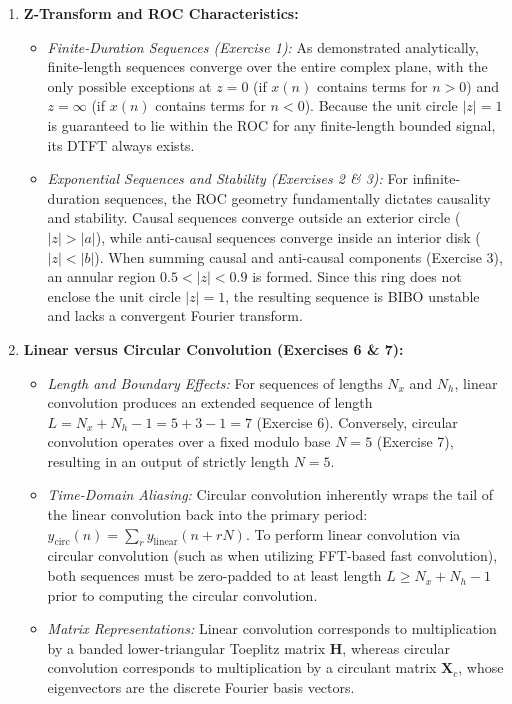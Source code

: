 \documentclass[12pt,a4paper]{article}
\begin{document}
\begin{enumerate}
    \item \textbf{Z-Transform and ROC Characteristics:}
    \begin{itemize}
        \item \emph{Finite-Duration Sequences (Exercise 1):} As demonstrated analytically, finite-length sequences converge over the entire complex plane, with the only possible exceptions at $z = 0$ (if $x(n)$ contains terms for $n > 0$) and $z = \infty$ (if $x(n)$ contains terms for $n < 0$). Because the unit circle $|z| = 1$ is guaranteed to lie within the ROC for any finite-length bounded signal, its DTFT always exists.
        \item \emph{Exponential Sequences and Stability (Exercises 2 \& 3):} For infinite-duration sequences, the ROC geometry fundamentally dictates causality and stability. Causal sequences converge outside an exterior circle ($|z| > |a|$), while anti-causal sequences converge inside an interior disk ($|z| < |b|$). When summing causal and anti-causal components (Exercise 3), an annular region $0.5 < |z| < 0.9$ is formed. Since this ring does not enclose the unit circle $|z| = 1$, the resulting sequence is BIBO unstable and lacks a convergent Fourier transform.
    \end{itemize}

    \item \textbf{Linear versus Circular Convolution (Exercises 6 \& 7):}
    \begin{itemize}
        \item \emph{Length and Boundary Effects:} For sequences of lengths $N_x$ and $N_h$, linear convolution produces an extended sequence of length $L = N_x + N_h - 1 = 5 + 3 - 1 = 7$ (Exercise 6). Conversely, circular convolution operates over a fixed modulo base $N = 5$ (Exercise 7), resulting in an output of strictly length $N = 5$.
        \item \emph{Time-Domain Aliasing:} Circular convolution inherently wraps the tail of the linear convolution back into the primary period: $y_{\text{circ}}(n) = \sum_{r} y_{\text{linear}}(n + rN)$. To perform linear convolution via circular convolution (such as when utilizing FFT-based fast convolution), both sequences must be zero-padded to at least length $L \ge N_x + N_h - 1$ prior to computing the circular convolution.
        \item \emph{Matrix Representations:} Linear convolution corresponds to multiplication by a banded lower-triangular Toeplitz matrix $\mathbf{H}$, whereas circular convolution corresponds to multiplication by a circulant matrix $\mathbf{X}_c$, whose eigenvectors are the discrete Fourier basis vectors.
    \end{itemize}


\end{enumerate}
\end{document}
